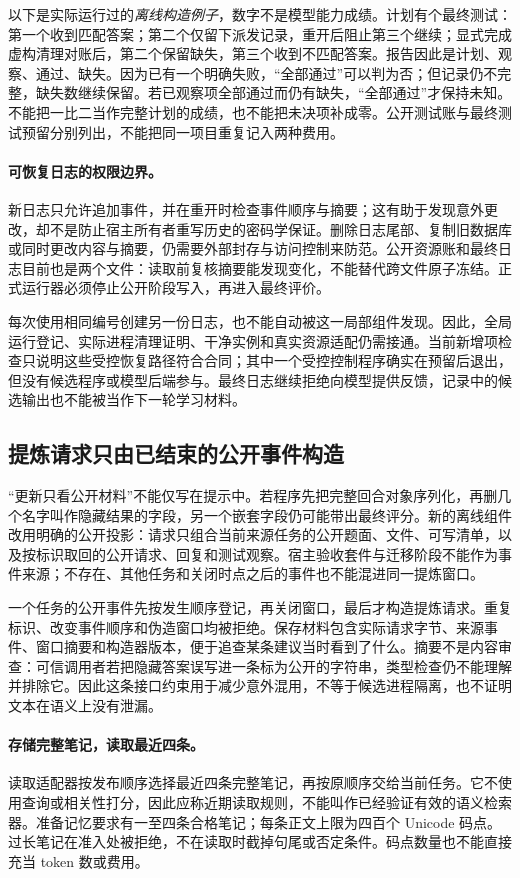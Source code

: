 以下是实际运行过的\emph{离线构造例子}，数字不是模型能力成绩。计划有个最终测试：第一个收到匹配答案；第二个仅留下派发记录，重开后阻止第三个继续；显式完成虚构清理对账后，第二个保留缺失，第三个收到不匹配答案。报告因此是计划、观察、通过、缺失。因为已有一个明确失败，“全部通过”可以判为否；但记录仍不完整，缺失数继续保留。若已观察项全部通过而仍有缺失，“全部通过”才保持未知。不能把一比二当作完整计划的成绩，也不能把未决项补成零。公开测试账与最终测试预留分别列出，不能把同一项目重复记入两种费用。

\paragraph{可恢复日志的权限边界。}
新日志只允许追加事件，并在重开时检查事件顺序与摘要；这有助于发现意外更改，却不是防止宿主所有者重写历史的密码学保证。删除日志尾部、复制旧数据库或同时更改内容与摘要，仍需要外部封存与访问控制来防范。公开资源账和最终日志目前也是两个文件：读取前复核摘要能发现变化，不能替代跨文件原子冻结。正式运行器必须停止公开阶段写入，再进入最终评价。

每次使用相同编号创建另一份日志，也不能自动被这一局部组件发现。因此，全局运行登记、实际进程清理证明、干净实例和真实资源适配仍需接通。当前新增项检查只说明这些受控恢复路径符合合同；其中一个受控控制程序确实在预留后退出，但没有候选程序或模型后端参与。最终日志继续拒绝向模型提供反馈，记录中的候选输出也不能被当作下一轮学习材料。

\subsection{提炼请求只由已结束的公开事件构造}

“更新只看公开材料”不能仅写在提示中。若程序先把完整回合对象序列化，再删几个名字叫作隐藏结果的字段，另一个嵌套字段仍可能带出最终评分。新的离线组件改用明确的公开投影：请求只组合当前来源任务的公开题面、文件、可写清单，以及按标识取回的公开请求、回复和测试观察。宿主验收套件与迁移阶段不能作为事件来源；不存在、其他任务和关闭时点之后的事件也不能混进同一提炼窗口。

一个任务的公开事件先按发生顺序登记，再关闭窗口，最后才构造提炼请求。重复标识、改变事件顺序和伪造窗口均被拒绝。保存材料包含实际请求字节、来源事件、窗口摘要和构造器版本，便于追查某条建议当时看到了什么。摘要不是内容审查：可信调用者若把隐藏答案误写进一条标为公开的字符串，类型检查仍不能理解并排除它。因此这条接口约束用于减少意外混用，不等于候选进程隔离，也不证明文本在语义上没有泄漏。

\paragraph{存储完整笔记，读取最近四条。}
读取适配器按发布顺序选择最近四条完整笔记，再按原顺序交给当前任务。它不使用查询或相关性打分，因此应称近期读取规则，不能叫作已经验证有效的语义检索器。准备记忆要求有一至四条合格笔记；每条正文上限为四百个 Unicode 码点。过长笔记在准入处被拒绝，不在读取时截掉句尾或否定条件。码点数量也不能直接充当 token 数或费用。

